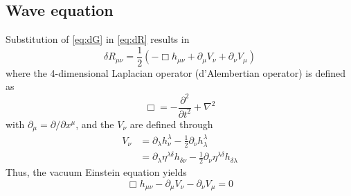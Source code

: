 \documentclass[a4paper,12pt]{extarticle}
\newcommand{\mn}{{\mu\nu}}
\numberwithin{equation}{subsection}
\begin{document}
\subsection{Wave equation}
Substitution of \eqref{eq:dG} in \eqref{eq:dR} results in
\begin{equation}
\delta R_\mn=\frac{1}{2}(-\Box h_\mn+\partial_\mu V_\nu+\partial_\nu V_\mu)
\end{equation}
where the 4-dimensional Laplacian operator (d'Alembertian operator) is defined as
\begin{equation*}
\Box=-\frac{\partial^2}{\partial t^2}+\nabla^2
\end{equation*}
with $\partial_\mu=\partial/\partial x^\mu$, and the $V_\nu$ are defined through
\begin{equation}
\begin{aligned}
V_\nu&=\partial_\lambda h_\nu^\lambda-\frac{1}{2}\partial_\nu h_\lambda^\lambda\\
&=\partial_\lambda \eta^{\lambda\delta}h_{\delta\nu}-\frac{1}{2}\partial_\nu \eta^{\lambda\delta}h_{\delta\lambda}
\end{aligned}
\end{equation}
Thus, the vacuum Einstein equation yields
\begin{equation}
\label{eq:vac}
\Box h_\mn-\partial_\mu V_\nu-\partial_\nu V_\mu=0
\end{equation}
\end{document}
